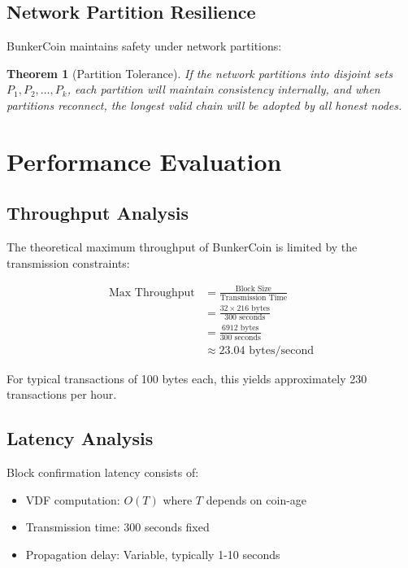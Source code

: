 \documentclass[11pt,a4paper]{article}
\newtheorem{theorem}{Theorem}[section]
\begin{document}
\subsection{Network Partition Resilience}

BunkerCoin maintains safety under network partitions:

\begin{theorem}[Partition Tolerance]
If the network partitions into disjoint sets $P_1, P_2, \ldots, P_k$, each partition will maintain consistency internally, and when partitions reconnect, the longest valid chain will be adopted by all honest nodes.
\end{theorem}

\section{Performance Evaluation}

\subsection{Throughput Analysis}

The theoretical maximum throughput of BunkerCoin is limited by the transmission constraints:

\begin{align}
\text{Max Throughput} &= \frac{\text{Block Size}}{\text{Transmission Time}}\\
&= \frac{32 \times 216 \text{ bytes}}{300 \text{ seconds}}\\
&= \frac{6912 \text{ bytes}}{300 \text{ seconds}}\\
&\approx 23.04 \text{ bytes/second}
\end{align}

For typical transactions of 100 bytes each, this yields approximately 230 transactions per hour.

\subsection{Latency Analysis}

Block confirmation latency consists of:
\begin{itemize}
\item VDF computation: $O(T)$ where $T$ depends on coin-age
\item Transmission time: 300 seconds fixed
\item Propagation delay: Variable, typically 1-10 seconds
\end{itemize}
\end{document}
